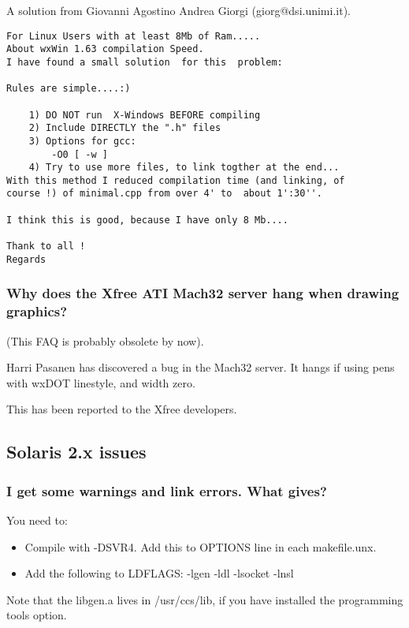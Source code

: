 A solution from Giovanni Agostino Andrea Giorgi (giorg@dsi.unimi.it).

\begin{verbatim}
For Linux Users with at least 8Mb of Ram.....
About wxWin 1.63 compilation Speed. 
I have found a small solution  for this  problem:

Rules are simple....:)

	1) DO NOT run  X-Windows BEFORE compiling
	2) Include DIRECTLY the ".h" files
	3) Options for gcc:
		-O0 [ -w ]
	4) Try to use more files, to link togther at the end...
With this method I reduced compilation time (and linking, of 
course !) of minimal.cpp from over 4' to  about 1':30''.

I think this is good, because I have only 8 Mb....

Thank to all !
Regards
\end{verbatim}

\subsubsection{Why does the Xfree ATI Mach32 server hang when drawing
graphics?}

(This FAQ is probably obsolete by now).

Harri Pasanen has discovered a bug in the Mach32 server.
It hangs if using pens with wxDOT linestyle, and width zero.

This has been reported to the Xfree developers.

\subsection{Solaris 2.x issues}

\subsubsection{I get some warnings and link errors. What gives?}

You need to:

\begin{itemize}
\item Compile with -DSVR4. Add this to OPTIONS line in each
makefile.unx.
\item Add the following to LDFLAGS: -lgen -ldl -lsocket -lnsl
\end{itemize}

Note that the libgen.a lives in /usr/ccs/lib, if you
have installed the programming tools option.

